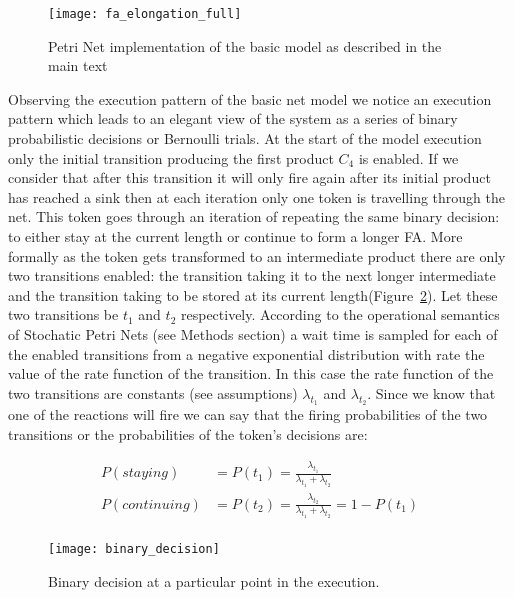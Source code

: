 \begin{figure}[htbp!]
\centering
\texttt{[image: fa\_elongation\_full]}
\caption[Petri Net implementation(basic model)]{Petri Net
  implementation of the basic model as described in the main text}
\label{fig:fa_elongation_full}
\end{figure}


Observing the execution pattern of the basic net model we notice an
execution pattern which leads to an elegant view of the system as a
series of binary probabilistic decisions or Bernoulli trials. At the start of the model
execution only the initial transition producing the first product $C_4$ is
enabled. If we consider that after this transition it
will only fire again after its initial product has reached a sink then
at each iteration only one token is travelling through the net. This token
goes through an iteration of repeating the same binary decision: to either stay at the current length or continue to form a longer FA. More formally as the token gets
transformed to an intermediate product there are only two transitions
enabled: the transition taking it to the next longer intermediate and
the transition taking to be stored at its current length(Figure~\ref{fig:binary_decision}). Let these
two transitions be $t_1$ and $t_2$ respectively. According to
the operational semantics of Stochatic Petri Nets (see Methods section)
a wait time is sampled for each of the enabled transitions from a
negative exponential distribution with rate the value of the rate
function of the
transition. In this case the rate function of the two transitions are
constants (see assumptions) $\lambda_{t_1}$ and $\lambda_{t_2}$. Since
we know that one of the reactions will fire we can say that the
firing probabilities of the two transitions or the probabilities of
the token's decisions are:

\begin{align*}
P(staying)& =P(t_1) = \frac{\lambda_{t_1}}{\lambda_{t_1} + \lambda_{t_2}}\\
P(continuing) & = P(t_2) = \frac{\lambda_{t_2}}{\lambda_{t_1} + \lambda_{t_2}} = 1 - P(t_1)\\
\end{align*}


\begin{figure}[htbp!]
\centering
\texttt{[image: binary\_decision]}
\caption[Binary stay-continue decision]{Binary decision at a
  particular point in the execution.}
\label{fig:binary_decision}
\end{figure}

